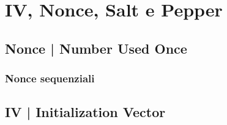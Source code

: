 
\textsf{\small }


\section{IV, Nonce, Salt e Pepper} %


\textsf{\small }

\subsection{Nonce | Number Used Once} %




\textsf{\small }

\subsubsection{Nonce sequenziali}


\textsf{\small }


\subsection{IV | Initialization Vector} %


